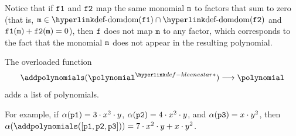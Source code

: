 \begin{mathpar}
\end{mathpar}
Notice that if $\texttt{f1}$ and $\texttt{f2}$ map the same monomial $\texttt{m}$ to factors that sum to zero
(that is, $\vm \in \dom(\vfone) \cap \dom(\vftwo)$ and $\texttt{f1}(\texttt{m}) + \texttt{f2}(\texttt{m}) = 0$),
then $\texttt{f}$ does not map $\texttt{m}$ to any factor, which corresponds to the fact that the monomial
$\texttt{m}$ does not appear in the resulting polynomial.

The overloaded function
\[
  \addpolynomials(\KleeneStar{\polynomial}) \aslto \polynomial
\]
adds a list of polynomials.

For example, if $\alpha(\texttt{p1}) = 3\cdot{}x^2\cdot{}y$,
$\alpha(\texttt{p2}) = 4\cdot{}x^2\cdot{}y$, and
$\alpha(\texttt{p3}) = x\cdot{}y^2$,
then $\alpha(\addpolynomials([\vpone, \vptwo, \vpthree])) = 7\cdot{}x^2\cdot{}y + x\cdot{}y^2$.



\begin{mathpar}
\end{mathpar}

